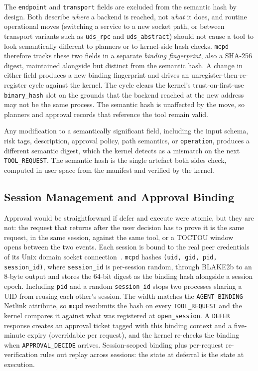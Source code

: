 The \texttt{endpoint} and \texttt{transport} fields are excluded from the semantic hash by design.
Both describe \emph{where} a backend is reached, not \emph{what} it does, and routine operational moves (switching a service to a new socket path, or between transport variants such as \texttt{uds\_rpc} and \texttt{uds\_abstract}) should not cause a tool to look semantically different to planners or to kernel-side hash checks.
\texttt{mcpd} therefore tracks these two fields in a separate \emph{binding fingerprint}, also a SHA-256 digest, maintained alongside but distinct from the semantic hash.
A change in either field produces a new binding fingerprint and drives an unregister-then-re-register cycle against the kernel. The cycle clears the kernel's trust-on-first-use \texttt{binary\_\allowbreak hash} slot on the grounds that the backend reached at the new address may not be the same process.
The semantic hash is unaffected by the move, so planners and approval records that reference the tool remain valid.

Any modification to a semantically significant field, including the input schema, risk tags, description, approval policy, path semantics, or \texttt{operation}, produces a different semantic digest, which the kernel detects as a mismatch on the next \texttt{TOOL\_\allowbreak REQUEST}.
The semantic hash is the single artefact both sides check, computed in user space from the manifest and verified by the kernel.



\subsection{Session Management and Approval Binding}

Approval would be straightforward if defer and execute were atomic, but they are not: the request that returns after the user decision has to prove it is the same request, in the same session, against the same tool, or a TOCTOU window~\cite{bishop2003computer, lee2021exprace} opens between the two events.
Each session is bound to the real peer credentials of its Unix domain socket connection~\cite{stevens2013unix}.
\texttt{mcpd} hashes \texttt{(uid, gid, pid, session\_id)}, where \texttt{session\_id} is per-session random, through BLAKE2b to an 8-byte output and stores the 64-bit digest as the binding hash alongside a session epoch.
Including \texttt{pid} and a random \texttt{session\_\allowbreak id} stops two processes sharing a UID from reusing each other's session.
The width matches the \texttt{AGENT\_\allowbreak BINDING} Netlink attribute, so \texttt{mcpd} resubmits the hash on every \texttt{TOOL\_\allowbreak REQUEST} and the kernel compares it against what was registered at \texttt{open\_\allowbreak session}.
A \texttt{DEFER} response creates an approval ticket tagged with this binding context and a five-minute expiry (overridable per request), and the kernel re-checks the binding when \texttt{APPROVAL\_\allowbreak DECIDE} arrives.
Session-scoped binding plus per-request re-verification rules out replay across sessions: the state at deferral is the state at execution.

